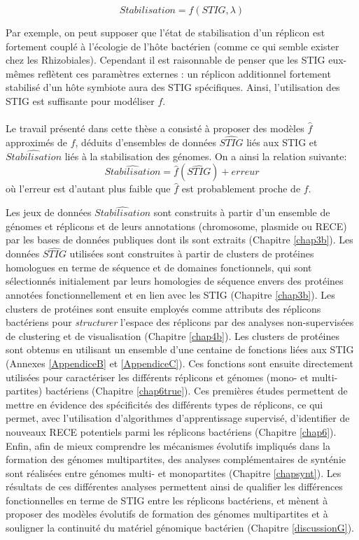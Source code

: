 $$Stabilisation = f(STIG,\lambda)$$

Par exemple, on peut supposer que l'état de stabilisation d'un réplicon est fortement couplé à l'écologie de l’hôte bactérien (comme ce qui semble exister chez les Rhizobiales). Cependant il est raisonnable de penser que les STIG eux-mêmes reflètent ces paramètres externes : un réplicon additionnel fortement stabilisé d'un hôte symbiote aura des STIG spécifiques. Ainsi, l'utilisation des STIG est suffisante pour modéliser $f$.\\
\\
Le travail présenté dans cette thèse a consisté à proposer des modèles $\hat{f}$ approximés de $f$, déduits d'ensembles de données $\widehat{STIG}$ liés aux STIG et $\widehat{Stabilisation}$ liés à la stabilisation des génomes. On a ainsi la relation suivante:
$$
\widehat{Stabilisation} = \hat{f}(\widehat{STIG}) + erreur
$$
où l'erreur est d'autant plus faible que $\hat{f}$ est probablement proche de $f$.  

Les jeux de données $\widehat{Stabilisation}$ sont construits à partir d'un ensemble de génomes et réplicons et de leurs annotations (chromosome, plasmide ou RECE) par les bases de données publiques dont ils sont extraits (Chapitre \ref{chap3b}). Les données $\widehat{STIG}$ utilisées sont construites à partir de clusters de protéines homologues en terme de séquence et de domaines fonctionnels, qui sont sélectionnés initialement par leurs homologies de séquence envers des protéines annotées fonctionnellement et en lien avec les STIG (Chapitre \ref{chap3b}). Les clusters de protéines sont ensuite employés comme attributs des réplicons bactériens pour \textit{structurer} l'espace des réplicons par des analyses non-supervisées de clustering et de visualisation (Chapitre \ref{chap4b}). Les clusters de protéines sont obtenus en utilisant un ensemble d'une centaine de fonctions liées aux STIG (Annexes \ref{AppendiceB} et \ref{AppendiceC}). Ces fonctions sont ensuite directement utilisées pour caractériser les différents réplicons et génomes (mono- et multi-partites) bactériens (Chapitre \ref{chap6true}). Ces premières études permettent de mettre en évidence des spécificités des différents types de réplicons, ce qui permet, avec l'utilisation d'algorithmes d'apprentissage supervisé, d'identifier de nouveaux RECE potentiels parmi les réplicons bactériens (Chapitre \ref{chap6}). Enfin, afin de mieux comprendre les mécanismes évolutifs impliqués dans la formation des génomes multipartites, des analyses complémentaires de synténie sont réalisées entre génomes multi- et monopartites (Chapitre \ref{chapsynt}). Les résultats de ces différentes analyses permettent ainsi de qualifier les différences fonctionnelles en terme de STIG entre les réplicons bactériens, et mènent à proposer des modèles évolutifs de formation des génomes multipartites et à souligner la continuité du matériel génomique bactérien (Chapitre \ref{discussionG}).
